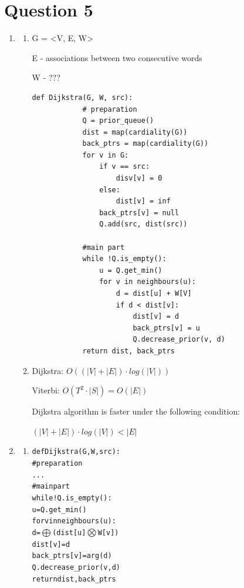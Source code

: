 \documentclass{article}
\begin{document}
\section*{Question 5} 
\begin{enumerate}[label = (\alph*)]
    \item
    \begin{enumerate}[label = (\roman*)]
    \item
    G = <V, E, W>
    
    E - associations between two consecutive words
    
    W - ???    
    
    \begin{Verbatim}[tabsize=4]
    	def Dijkstra(G, W, src):
    		# preparation
    		Q = prior_queue()
    		dist = map(cardiality(G))
    		back_ptrs = map(cardiality(G))
    		for v in G:
    			if v == src: 
    				disv[v] = 0
    			else:
    				dist[v] = inf
    			back_ptrs[v] = null
    			Q.add(src, dist(src))
    			
    		#main part
    		while !Q.is_empty():
    			u = Q.get_min()
    			for v in neighbours(u):
    				d = dist[u] + W[V]
    				if d < dist[v]:
    					dist[v] = d
    					back_ptrs[v] = u
    					Q.decrease_prior(v, d)
    		return dist, back_ptrs
    	\end{Verbatim}
    	
    	\item
    	Dijkstra: $O((|V|+|E|) \cdot log(|V|))$
    	
    	Viterbi: $O(T^2 \cdot |S|) = O(|E|)$
    	
    	Dijkstra algorithm is faster under the following condition:
   
    	 $(|V|+|E|) \cdot log(|V|) < |E|$
    	
	\end{enumerate}
	
	\item
	
	\begin{enumerate}[label = (\roman*)]
    \item
       \begin{alltt}
    	def Dijkstra(G, W, src):
    	    # preparation
    	    ...
    	    #main part
    	    while !Q.is_empty():
    	        u = Q.get_min()
    	        for v in neighbours(u):
    	            d = \(\bigoplus \)(dist[u] \(\bigotimes \) W[v])
    	            dist[v] = d
    	            back_ptrs[v] = arg(d)
                Q.decrease_prior(v, d)
    		return dist, back_ptrs
    	\end{alltt}
    
    \end{enumerate}
 	    
\end{enumerate}
\end{document}
